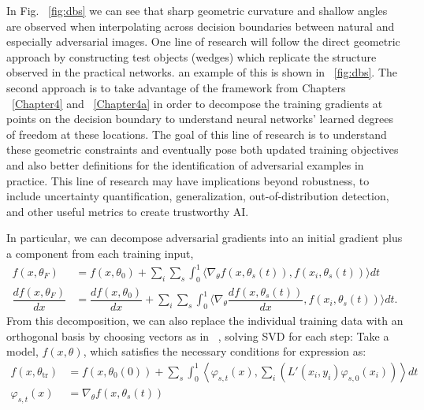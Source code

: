 In Fig. ~\ref{fig:dbs} we can see that sharp geometric curvature
and shallow angles are observed when interpolating across decision
boundaries between natural and especially adversarial images. One line
of research will follow the direct geometric approach by constructing
test objects (wedges) which replicate the structure observed in the
practical networks. an example of this is shown in ~\ref{fig:dbs}. The
second approach is to take advantage of the framework from Chapters
~\ref{Chapter4} and ~\ref{Chapter4a} in order to decompose the
training gradients at points on the decision boundary to understand
neural networks' learned degrees of freedom at these locations. The
goal of this line of research is to understand these geometric
constraints and eventually pose both updated training objectives and
also better definitions for the identification of adversarial examples
in practice. This line of research may have implications beyond
robustness, to include uncertainty quantification, generalization,
out-of-distribution detection, and other useful metrics to create
trustworthy AI.

In particular, we can decompose adversarial gradients into an
initial gradient plus a component from each training input,
\begin{align}
  f(x, \theta_F) &= f(x, \theta_0) + \sum_i \sum_s \int_0^1 \langle
  \nabla_\theta f(x, \theta_s(t)), f(x_i, \theta_s(t))\rangle dt \\
  \dfrac{d f(x, \theta_F)}{dx} &= \dfrac{d f(x, \theta_0)}{dx} + \sum_i \sum_s \int_0^1 \langle
  \nabla_\theta \dfrac{d f(x, \theta_s(t))}{dx}, f(x_i,
                                 \theta_s(t))\rangle dt.
\end{align}
From this decomposition, we can also replace the individual training
data with an orthogonal basis by choosing vectors as in
~\citet{halko2011finding}, solving SVD for each step:
    Take a model, $f(x, \theta)$, which satisfies the necessary conditions for expression as:
 \begin{align}
     f(x, \theta_\text{tr}) &= f(x, \theta_0(0)) +  \sum_s
\int_0^1                                  \left\langle 
                                   \varphi_{s,t}(x) , \sum_i
                                   \left(L'(x_i, y_i) \varphi_{s,
                                   0}(x_i)\right) \right \rangle dt\\
     \varphi_{s,t}(x) &= \nabla_\theta f(x, \theta_s(t))
 \end{align}


